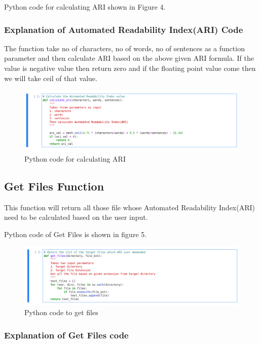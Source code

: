 \documentclass{article}
\begin{document}
Python code for calculating ARI shown in Figure 4.


\subsubsection{Explanation of Automated Readability Index(ARI) Code}

The function take no of characters, no of words, no of sentences as a function parameter and then calculate ARI based on the above given ARI formula. If the value is negative value then return zero and if the floating point value come then we will take ceil of that value. 


\begin{figure}
\centering
\includegraphics[scale=0.2]{screenshots/ai_a1-4.png}
\caption{\label{fig:python_code_calcualte_ari}Python code for calculating ARI}
\end{figure}

\subsection{Get Files Function}
This function will return all those file whose Automated Readability Index(ARI) need to be calculated based on the user input.

Python code of Get Files is shown in figure 5.

\begin{figure}
\centering
\includegraphics[scale=0.2]{screenshots/ai_a1-5.png}
\caption{\label{fig:python_code_get_files}Python code to get files}
\end{figure}

\subsubsection{Explanation of Get Files code}
\end{document}
